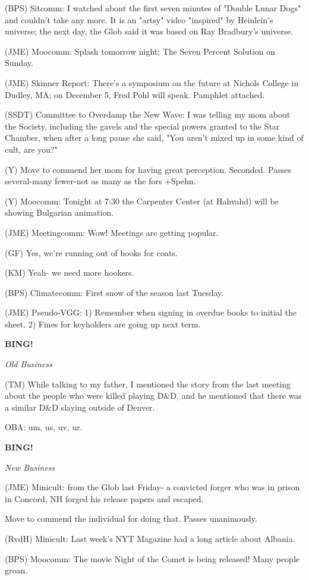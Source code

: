 \documentclass[12pt]{article}
\newcommand{\bing}{{\bf BING!} }
\newcommand{\goto}[1]{\bing \vskip 12pt \centerline{{\em{#1}}}}
\begin{document}
(BPS) Sitcomm: I watched about the first seven minutes of "Double Lunar Dogs" and couldn't take any more. It is an "artsy" video "inspired" by Heinlein's universe; the next day, the Glob said it was based on Ray Bradbury's universe.

(JME) Moocomm: Splash tomorrow night; The Seven Percent Solution on Sunday.

(JME) Skinner Report: There's a symposium on the future at Nichols College in Dudley, MA; on December 5, Fred Pohl will speak. Pamphlet attached.

(SSDT) Committee to Overdamp the New Wave: I was telling my mom about the Society, including the gavels and the special powers granted to the Star Chamber, when after a long pause she said, "You aren't mixed up in some kind of cult, are you?"

(Y) Move to commend her mom for having great perception. Seconded. Passes several-many fewer-not as many as the fors +Spehn.

(Y) Moocomm: Tonight at 7:30 the Carpenter Center (at Hahvahd) will be showing Bulgarian animation.

(JME) Meetingcomm: Wow! Meetings are getting popular.

(GF) Yes, we're running out of hooks for coats.

(KM) Yeah- we need more hookers.

(BPS) Climatecomm: First snow of the season last Tuesday.

(JME) Pseudo-VGG: 1) Remember when signing in overdue books to initial the sheet. 2) Fines for keyholders are going up next term.

\goto{Old Business}

(TM) While talking to my father, I mentioned the story from the last meeting about the people who were killed playing D&D, and he mentioned that there was a similar D&D slaying outside of Denver.

OBA: um, us, uv, ur.

\goto{New Business}

(JME) Minicult: from the Glob last Friday- a convicted forger who was in prison in Concord, NH forged his release papers and escaped.

Move to commend the individual for doing that. Passes unanimously.

(RvdH) Minicult: Last week's NYT Magazine had a long article about Albania.

(BPS) Moocomm: The movie Night of the Comet is being released! Many people groan.
\end{document}
